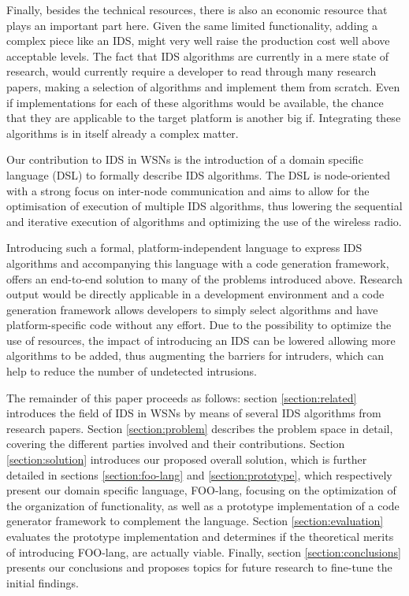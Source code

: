 \documentclass[conference]{IEEEtran}
\begin{document}
Finally, besides the technical resources, there is also an economic resource
that plays an important part here. Given the same limited functionality, adding
a complex piece like an IDS, might very well raise the production cost well
above acceptable levels. The fact that IDS algorithms are currently in a mere
state of research, would currently require a developer to read through many
research papers, making a selection of algorithms and implement them from
scratch. Even if implementations for each of these algorithms would be
available, the chance that they are applicable to the target platform is
another big if. Integrating these algorithms is in itself already a complex
matter.

Our contribution to IDS in WSNs is the introduction of a domain specific
language (DSL) to formally describe IDS algorithms. The DSL is node-oriented
with a strong focus on inter-node communication and aims to allow for the
optimisation of execution of multiple IDS algorithms, thus lowering the
sequential and iterative execution of algorithms and optimizing the use of the
wireless radio.

Introducing such a formal, platform-independent language to express IDS
algorithms and accompanying this language with a code generation framework,
offers an end-to-end solution to many of the problems introduced above.
Research output would be directly applicable in a development environment and a
code generation framework allows developers to simply select algorithms and
have platform-specific code without any effort. Due to the possibility to
optimize the use of resources, the impact of introducing an IDS can be lowered
allowing more algorithms to be added, thus augmenting the barriers for
intruders, which can help to reduce the number of undetected intrusions.

The remainder of this paper proceeds as follows: section \ref{section:related}
introduces the field of IDS in WSNs by means of several IDS algorithms from
research papers. Section \ref{section:problem} describes the problem space in
detail, covering the different parties involved and their contributions.
Section \ref{section:solution} introduces our proposed overall solution, which
is further detailed in sections \ref{section:foo-lang} and
\ref{section:prototype}, which respectively present our domain specific
language, FOO-lang, focusing on the optimization of the organization of
functionality, as well as a prototype implementation of a code generator
framework to complement the language. Section \ref{section:evaluation}
evaluates the prototype implementation and determines if the theoretical merits
of introducing FOO-lang, are actually viable. Finally, section
\ref{section:conclusions} presents our conclusions and proposes topics for
future research to fine-tune the initial findings.
\end{document}
